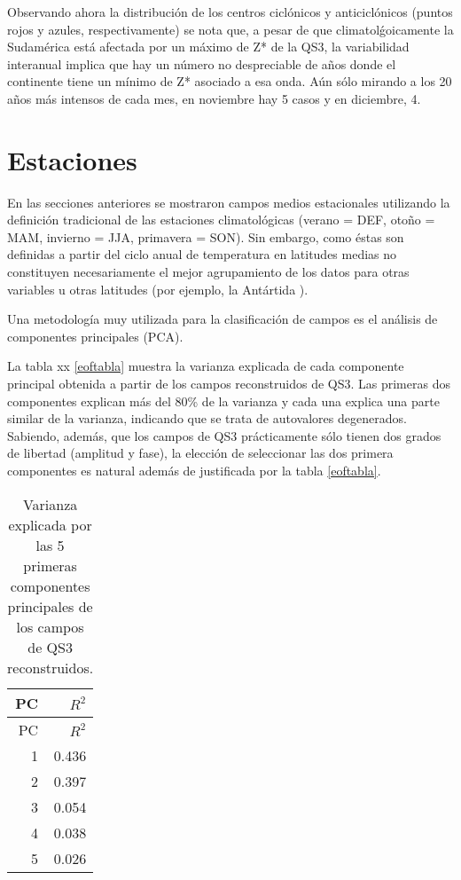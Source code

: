 \documentclass[spanish,a4paper,12p]{book}
\begin{document}
Observando ahora la distribución de los centros ciclónicos y
anticiclónicos (puntos rojos y azules,
respectivamente)
se nota que, a pesar de que climatolǵoicamente la Sudamérica está
afectada por un máximo de Z* de la QS3, la variabilidad interanual
implica que hay un número no despreciable de años donde el continente
tiene un mínimo de Z* asociado a esa onda. Aún sólo mirando a los 20
años más intensos de cada mes, en noviembre hay 5 casos y en diciembre,
4.

\section{Estaciones}\label{estaciones}

En las secciones anteriores se mostraron campos medios estacionales
utilizando la definición tradicional de las estaciones climatológicas
(verano = DEF, otoño = MAM, invierno = JJA, primavera = SON). Sin
embargo, como éstas son definidas a partir del ciclo anual de
temperatura en latitudes medias no constituyen necesariamente el mejor
agrupamiento de los datos para otras variables u otras latitudes (por
ejemplo, la Antártida ).

Una metodología muy utilizada para la clasificación de campos es el
análisis de componentes principales
(PCA).

La tabla xx \ref{eoftabla} muestra la
varianza explicada de cada componente principal obtenida a partir de los
campos reconstruidos de QS3. Las primeras dos componentes explican más
del 80\% de la varianza y cada una explica una parte similar de la
varianza, indicando que se trata de autovalores
degenerados. Sabiendo, además, que los campos
de QS3 prácticamente sólo tienen dos grados de libertad (amplitud y
fase), la elección de seleccionar las dos primera componentes es natural
además de justificada por la tabla \ref{eoftabla}.

\begin{longtable}[]{@{}rr@{}}
\caption{Varianza explicada por las 5 primeras componentes principales
de los campos de QS3 reconstruidos.}\tabularnewline
\toprule
PC & \(R^2\)\tabularnewline
\midrule
\endfirsthead
\toprule
PC & \(R^2\)\tabularnewline
\midrule
\endhead
1 & 0.436\tabularnewline
2 & 0.397\tabularnewline
3 & 0.054\tabularnewline
4 & 0.038\tabularnewline
5 & 0.026\tabularnewline
\bottomrule
\end{longtable}
\end{document}
